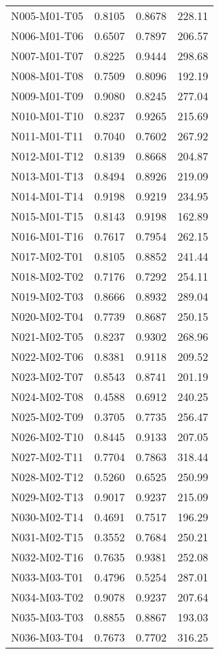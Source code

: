 \begin{longtable}[c]{|l|c|l|l|}
N005-M01-T05 & 0.8105 & 0.8678 & 228.11 \\
N006-M01-T06 & 0.6507 & 0.7897 & 206.57 \\
N007-M01-T07 & 0.8225 & 0.9444 & 298.68 \\
N008-M01-T08 & 0.7509 & 0.8096 & 192.19 \\
N009-M01-T09 & 0.9080 & 0.8245 & 277.04 \\
N010-M01-T10 & 0.8237 & 0.9265 & 215.69 \\
N011-M01-T11 & 0.7040 & 0.7602 & 267.92 \\
N012-M01-T12 & 0.8139 & 0.8668 & 204.87 \\
N013-M01-T13 & 0.8494 & 0.8926 & 219.09 \\
N014-M01-T14 & 0.9198 & 0.9219 & 234.95 \\
N015-M01-T15 & 0.8143 & 0.9198 & 162.89 \\
N016-M01-T16 & 0.7617 & 0.7954 & 262.15 \\
N017-M02-T01 & 0.8105 & 0.8852 & 241.44 \\
N018-M02-T02 & 0.7176 & 0.7292 & 254.11 \\
N019-M02-T03 & 0.8666 & 0.8932 & 289.04 \\
N020-M02-T04 & 0.7739 & 0.8687 & 250.15 \\
N021-M02-T05 & 0.8237 & 0.9302 & 268.96 \\
N022-M02-T06 & 0.8381 & 0.9118 & 209.52 \\
N023-M02-T07 & 0.8543 & 0.8741 & 201.19 \\
N024-M02-T08 & 0.4588 & 0.6912 & 240.25 \\
N025-M02-T09 & 0.3705 & 0.7735 & 256.47 \\
N026-M02-T10 & 0.8445 & 0.9133 & 207.05 \\
N027-M02-T11 & 0.7704 & 0.7863 & 318.44 \\
N028-M02-T12 & 0.5260 & 0.6525 & 250.99 \\
N029-M02-T13 & 0.9017 & 0.9237 & 215.09 \\
N030-M02-T14 & 0.4691 & 0.7517 & 196.29 \\
N031-M02-T15 & 0.3552 & 0.7684 & 250.21 \\
N032-M02-T16 & 0.7635 & 0.9381 & 252.08 \\
N033-M03-T01 & 0.4796 & 0.5254 & 287.01 \\
N034-M03-T02 & 0.9078 & 0.9237 & 207.64 \\
N035-M03-T03 & 0.8855 & 0.8867 & 193.03 \\
N036-M03-T04 & 0.7673 & 0.7702 & 316.25 \\

\end{longtable}
